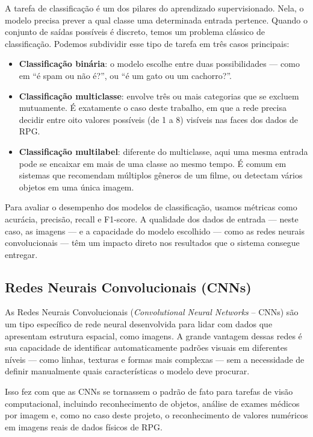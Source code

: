 A tarefa de classificação é um dos pilares do aprendizado supervisionado. Nela, o modelo precisa prever a qual classe uma determinada entrada 
pertence. Quando o conjunto de saídas possíveis é discreto, temos um problema clássico de classificação. Podemos subdividir esse tipo de 
tarefa em três casos principais:
\begin{itemize}
    \item \textbf{Classificação binária}: o modelo escolhe entre duas possibilidades — como em “é spam ou não é?”, ou “é um gato ou um cachorro?”.
    \item \textbf{Classificação multiclasse}: envolve três ou mais categorias que se excluem mutuamente. É exatamente o caso deste trabalho, em 
    que a rede precisa decidir entre oito valores possíveis (de 1 a 8) visíveis nas faces dos dados de RPG.
    \item \textbf{Classificação multilabel}: diferente do multiclasse, aqui uma mesma entrada pode se encaixar em mais de uma classe ao mesmo 
    tempo. É comum em sistemas que recomendam múltiplos gêneros de um filme, ou detectam vários objetos em uma única imagem.
\end{itemize}

Para avaliar o desempenho dos modelos de classificação, usamos métricas como acurácia, precisão, recall e F1-score. A qualidade dos dados de 
entrada — neste caso, as imagens — e a capacidade do modelo escolhido — como as redes neurais convolucionais — têm um impacto direto nos 
resultados que o sistema consegue entregar.

\subsection{Redes Neurais Convolucionais (CNNs)}

As Redes Neurais Convolucionais (\textit{Convolutional Neural Networks} – CNNs) são um tipo específico de rede neural desenvolvida para lidar 
com dados que apresentam estrutura espacial, como imagens. A grande vantagem dessas redes é sua capacidade de identificar automaticamente 
padrões visuais em diferentes níveis — como linhas, texturas e formas mais complexas — sem a necessidade de definir manualmente quais 
características o modelo deve procurar.

Isso fez com que as CNNs se tornassem o padrão de fato para tarefas de visão computacional, incluindo reconhecimento de objetos, 
análise de exames médicos por imagem e, como no caso deste projeto, o reconhecimento de valores numéricos em imagens reais de dados 
físicos de RPG. \cite{lecun1998gradient, goodfellow2016deep}

